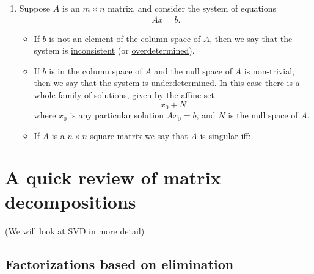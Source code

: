 \begin{enumerate}
\item Suppose $A$ is an $m\times n$ matrix, and consider the system of equations 
    \begin{align*}
        Ax = b.
    \end{align*}
    \begin{itemize}
        \item If $b$ is not an element of the column space of $A$, then we say that the system is \underline{inconsistent} (or \underline{overdetermined}). \\
        \item If $b$ is in the column space of $A$ and the null space of $A$ is non-trivial, then we say that the system is \underline{underdetermined}. In this case there is a whole family of solutions, given by the affine set
            $$x_0 + N$$
        where $x_0$ is any particular solution $Ax_0 = b$, and $N$ is the null space of $A$. \\
        \item If $A$ is a $n\times n$ square matrix we say that $A$ is \underline{singular} iff:
    \end{itemize}
\end{enumerate}

\newpage
\section{A quick review of matrix decompositions}

(We will look at SVD in more detail)

\subsection{Factorizations based on elimination}

